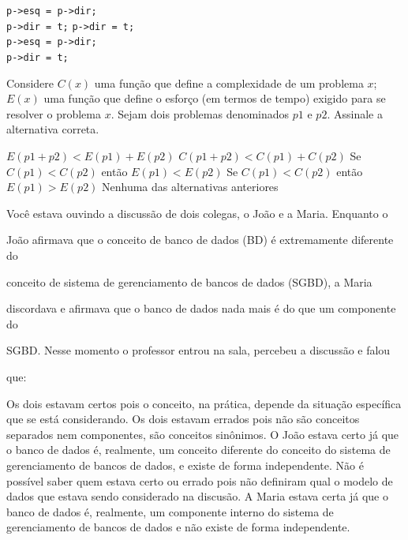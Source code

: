 \documentclass[12pt, addpoints]{exam}
\begin{document}
\begin{questions}
\begin{choices}
          \texttt{p->esq = p->dir;} \\

          \texttt{p->dir = t;}
\choice \texttt{p->dir = t;} \\

          \texttt{p->esq = p->dir;} \\

          \texttt{p->dir = t;}
\end{choices}

\question

Considere \( C(x) \) uma função que define a complexidade de um problema \( x \); \( E(x) \) uma função que define o esforço (em termos de tempo) exigido para se resolver o problema \( x \). Sejam dois problemas denominados \( p1 \) e \( p2 \). Assinale a alternativa correta.


\begin{choices}
\choice \( E(p1 + p2) < E(p1) + E(p2) \)
\choice \( C(p1 + p2) < C(p1) + C(p2) \)
\choice Se \( C(p1) < C(p2) \) então \( E(p1) < E(p2) \)
\choice Se \( C(p1) < C(p2) \) então \( E(p1) > E(p2) \)
\choice Nenhuma das alternativas anteriores
\end{choices}

\question

Você estava ouvindo a discussão de dois colegas, o João e a Maria. Enquanto o

João afirmava que o conceito de banco de dados (BD) é extremamente diferente do

conceito de sistema de gerenciamento de bancos de dados (SGBD), a Maria

discordava e afirmava que o banco de dados nada mais é do que um componente do

SGBD. Nesse momento o professor entrou na sala, percebeu a discussão e falou

que:
\begin{choices}
\choice Os dois estavam certos pois o conceito, na prática, depende da situação específica que se está considerando.
\choice Os dois estavam errados pois não são conceitos separados nem componentes, são conceitos sinônimos.
\choice O João estava certo já que o banco de dados é, realmente, um conceito diferente do conceito do sistema de gerenciamento de bancos de dados, e existe de forma independente.
\choice Não é possível saber quem estava certo ou errado pois não definiram qual o modelo de dados que estava sendo considerado na discusão.
\choice A Maria estava certa já que o banco de dados é, realmente, um componente interno do sistema de gerenciamento de bancos de dados e não existe de forma independente.
\end{choices}


\end{questions}
\end{document}
